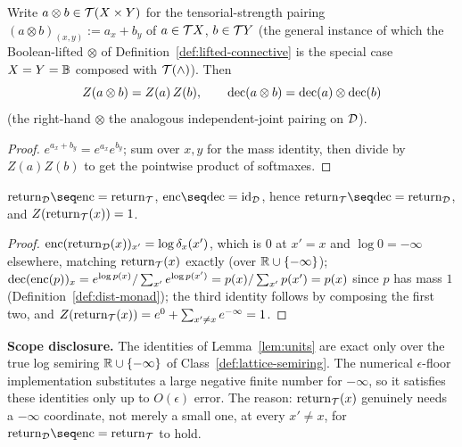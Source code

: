 \begin{lemma}[Tensor]
\label{lem:tensor}
\leanok
Write $a \otimes b \in \mathcal T(X\times Y)$ for the tensorial-strength
pairing $(a\otimes b)_{(x,y)} := a_x+b_y$ of $a \in \mathcal T X$, $b \in
\mathcal T Y$ (the general instance of which the Boolean-lifted $\otimes$ of
Definition~\ref{def:lifted-connective} is the special case $X=Y=\mathbb B$
composed with $\mathcal T(\wedge)$). Then
\[
  Z(a \otimes b) = Z(a)\,Z(b), \qquad
  \mathrm{dec}(a \otimes b) = \mathrm{dec}(a) \otimes \mathrm{dec}(b)
\]
(the right-hand $\otimes$ the analogous independent-joint pairing on
$\mathcal D$).
\end{lemma}

\begin{proof}
\leanok
$e^{a_x+b_y} = e^{a_x}e^{b_y}$; sum over $x,y$ for the
mass identity, then divide by $Z(a)Z(b)$ to get the pointwise product
of softmaxes.
\end{proof}

\begin{lemma}[Units]
\label{lem:units}
\leanok
$\Ret_{\Dmon} \seq \enc = \Ret_{\Tmon}$, $\enc \seq \dec =
\mathrm{id}_{\Dmon}$, hence $\Ret_{\Tmon} \seq \dec = \Ret_{\Dmon}$,
and $Z(\mathrm{return}_{\mathcal T}(x)) = 1$.
\end{lemma}

\begin{proof}
\leanok
$\mathrm{enc}(\mathrm{return}_{\mathcal D}(x))_{x'} = \log \delta_x(x')$, which
is $0$ at $x'=x$ and $\log 0 = -\infty$ elsewhere, matching
$\mathrm{return}_{\mathcal T}(x)$ exactly (over $\mathbb R \cup \{-\infty\}$); $\mathrm{dec}(\mathrm{enc}(p))_x =
e^{\log p(x)}/\sum_{x'} e^{\log p(x')} = p(x)/\sum_{x'}p(x') = p(x)$
since $p$ has mass $1$ (Definition~\ref{def:dist-monad}); the third
identity follows by composing the first two, and
$Z(\mathrm{return}_{\mathcal T}(x)) = e^0 + \sum_{x'\ne x}e^{-\infty} = 1$.
\end{proof}

\textbf{Scope disclosure.} The identities of Lemma~\ref{lem:units} are
exact only over the true log semiring $\mathbb R \cup \{-\infty\}$ of Class~\ref{def:lattice-semiring}. The numerical
$\epsilon$-floor implementation substitutes a large negative finite
number for $-\infty$, so it satisfies these identities only up to
$O(\epsilon)$ error. The reason: $\mathrm{return}_{\mathcal T}(x)$ genuinely needs a
$-\infty$ coordinate, not merely a small one, at every $x' \ne x$, for
$\Ret_{\Dmon}\seq\enc = \Ret_{\Tmon}$ to hold.

